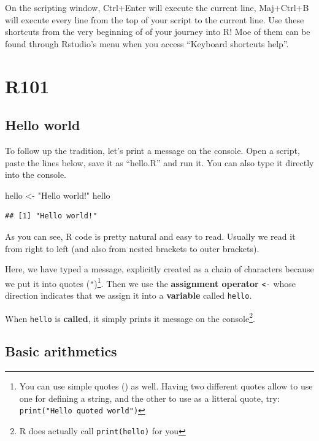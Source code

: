 \documentclass[
]{book}
\newenvironment{Shaded}{\begin{snugshade}}{\end{snugshade}}
\newcommand{\NormalTok}[1]{#1}
\newcommand{\OtherTok}[1]{\textcolor[rgb]{0.56,0.35,0.01}{#1}}
\newcommand{\StringTok}[1]{\textcolor[rgb]{0.31,0.60,0.02}{#1}}
\begin{document}
On the scripting window, Ctrl+Enter will execute the current line, Maj+Ctrl+B will execute every line from the top of your script to the current line. Use these shortcuts from the very beginning of of your journey into R! Moe of them can be found through Rstudio's menu when you access ``Keyboard shortcuts help''.

\hypertarget{r101}{%
\chapter{R101}\label{r101}}

\hypertarget{hello-world}{%
\section{Hello world}\label{hello-world}}

To follow up the tradition, let's print a message on the console. Open a script, paste the lines below, save it as ``hello.R'' and run it. You can also type it directly into the console.

\begin{Shaded}
\begin{Highlighting}[]
\NormalTok{hello }\OtherTok{\textless{}{-}} \StringTok{"Hello world!"}
\NormalTok{hello}
\end{Highlighting}
\end{Shaded}

\begin{verbatim}
## [1] "Hello world!"
\end{verbatim}

As you can see, R code is pretty natural and easy to read. Usually we read it from right to left (and also from nested brackets to outer brackets).

Here, we have typed a message, explicitly created as a chain of characters because we put it into quotes (\texttt{"})\footnote{You can use simple quotes (\texttt{\textquotesingle{}}) as well. Having two different quotes allow to use one for defining a string, and the other to use as a litteral quote, try: \texttt{print("Hello\ \textquotesingle{}quoted\textquotesingle{}\ world")}}. Then we use the \textbf{assignment operator} \texttt{\textless{}-} whose direction indicates that we assign it into a \textbf{variable} called \texttt{hello}.

When \texttt{hello} is \textbf{called}, it simply prints it message on the console\footnote{R does actually call \texttt{print(hello)} for you}.

\hypertarget{basic-arithmetics}{%
\section{Basic arithmetics}\label{basic-arithmetics}}
\end{document}
